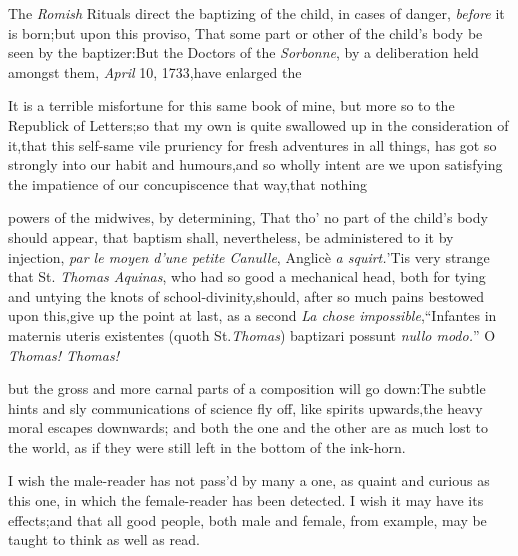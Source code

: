 \documentclass{article}
\begin{document}
\vfill
\bgroup\fontsize{8}{11}\selectfont
\indent\fnast\enspace The \textit{Romish} Rituals direct
the baptizing of the child, in cases of danger, \textit{before} it is born;\tsk  but
upon this proviso, That some part or other of the child’s body be seen by the
baptizer:\tsh  But the Doctors of the \textit{Sorbonne}, by a deliberation held
amongst them, \textit{April} 10, 1733,\tsk  have enlarged
the\break{}\par\egroup\eject

It is a terrible misfortune for this same book of mine, but more
so to the Republick of Letters;\tsk  so that my own\break
is quite swallowed up in the consideration of it,\tsk  that this
self-same vile pruriency for fresh adventures in all things, has
got so strongly into our habit and humours,\tsk  and so wholly
intent are we upon satisfying the impatience of our
concupiscence that way,\tsk  that nothing\break{}


\bgroup\fontsize{8}{11}\selectfont
\noindent powers of the midwives, by determining, That\break
tho’ no part of the child’s body should appear,\tsk\break
that baptism shall, nevertheless, be administered to it by injection,\tsk
\textit{par le moyen d’une petite Canulle},\tsk\break
Anglicè \textit{a squirt.}\tsk  ’Tis very strange that St.\@
\textit{Thomas Aquinas}, who had so good a mechanical head, both
for tying and untying the knots of school-divinity,\tsk  should,
after so much pains bestowed upon this,\tsk  give up the point
at last, as a second \textit{La chose impossible},\tsk “Infantes
in maternis uteris existentes (quoth St.\@  \textit{Thomas})
baptizari possunt \textit{nullo modo.}”\tsk\break
O \textit{Thomas! Thomas!}\\\par\egroup\eject

\noindent
but the gross and more carnal parts of a composition will go
down:\tsk  The subtle hints and sly communications of science
fly off, like spirits upwards,\tsk  the heavy moral escapes
downwards; and both the one and the other are as much lost to
the world, as if they were still left in the bottom of the
ink-horn.

I wish the male-reader has not pass’d by many a one, as
quaint and curious as this one, in which the female-reader has been
detected. I wish it may have its effects;\tsk  and that all good
people, both male and female, from example, may be taught to think
as well as read.

\end{document}
